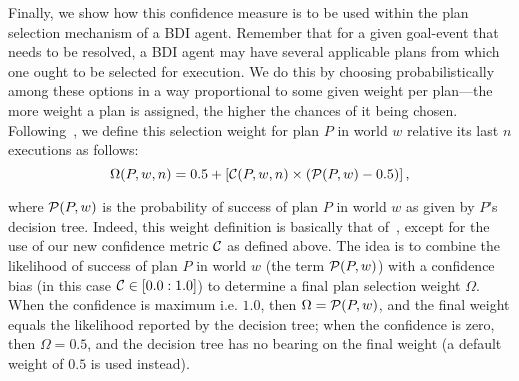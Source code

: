 

Finally, we show how this confidence measure is to be used within the plan selection mechanism of a BDI agent. Remember that for a given goal-event that needs to be resolved, a BDI agent may have several applicable plans from which one ought to be selected for execution. We do this by choosing probabilistically among these options in a way proportional to some given weight per plan---the more weight a plan is assigned, the higher the chances of it being chosen. 
Following~\cite{singh10:extending,singh10:learning}, we define this selection weight for plan $P$ in world $w$ relative its last $n$ executions as follows: 
\[
	\Omega(P,w,n) = 0.5 + \left[  \C(P,w,n) \times  \left( \P(P,w) - 0.5 \right)  \right],
\label{eqn:omega}   
\]

\noindent 
where $\P(P,w)$ is the probability of success of plan $P$ in world $w$ as given by $P$'s decision tree. 
%
Indeed, this weight definition is basically that of~\cite{singh10:extending,singh10:learning}, except for the use of our new confidence metric $\C$ as defined above. The idea is to combine the likelihood of success of plan $P$ in world $w$ (the term $\P(P,w)$) with a confidence bias (in this case $\C \in [0.0:1.0]$) to determine a final plan selection weight $\Omega$. 
When the confidence is maximum i.e. $1.0$, then $\Omega = \P(P,w)$, and the final weight equals the likelihood reported by the decision tree; when the confidence is zero, then $\Omega=0.5$, and the decision tree has no bearing on the final weight (a default weight of $0.5$ is used instead).

